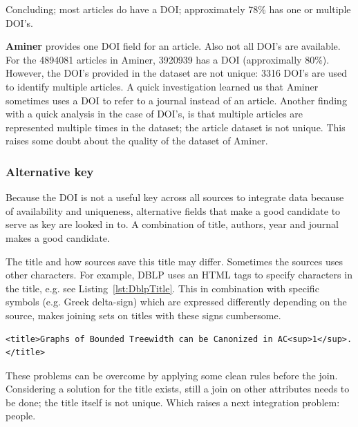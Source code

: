 \documentclass{ou-report}
\newcommand{\doi}{{DOI}}
\newcommand{\dblp}{DBLP}
\begin{document}
Concluding; most articles do have a \doi{}; approximately 78\% has one or multiple 
\doi{}'s.

\textbf{Aminer} provides one \doi{} field for an article. Also not all DOI's are 
available. For the 4894081 articles in Aminer, 3920939 has a \doi{} (approximally 
80\%). However, the \doi{}'s provided in the dataset are not unique: 3316 DOI's are 
used to identify multiple articles. A quick investigation learned us that Aminer 
sometimes uses a \doi{} to refer to a journal instead of an article. Another 
finding with a quick analysis in the case of \doi{}'s, is that multiple articles
are represented multiple times in the dataset; the article dataset is not 
unique. This raises some doubt about the quality of the dataset of Aminer.

\subsubsection{Alternative key}
Because the \doi{} is not a useful key across all sources to integrate data 
because of availability and uniqueness, alternative fields that make a good 
candidate to serve as key are looked in to. 
A combination of title, authors, year and journal makes a good candidate.

The title and how sources save this title may differ. 
Sometimes the sources uses other characters. For example, \dblp{} uses an HTML
tags to specify characters in the title, e.g. see 
Listing~\ref{lst:DblpTitle}. This in combination 
with specific symbols (e.g. Greek delta-sign) which are expressed differently 
depending on the source, makes joining sets on titles with these signs
cumbersome.

\lstset{language=XML}
\begin{lstlisting}[caption={Example title in \dblp{}},label={lst:DblpTitle}]
<title>Graphs of Bounded Treewidth can be Canonized in AC<sup>1</sup>.</title>
\end{lstlisting}

These problems can be overcome by applying some clean rules before the join. 
Considering a solution for the title exists, still a join on other attributes
needs to be done; the title itself is not unique.
Which raises a next integration problem: people.

\end{document}
